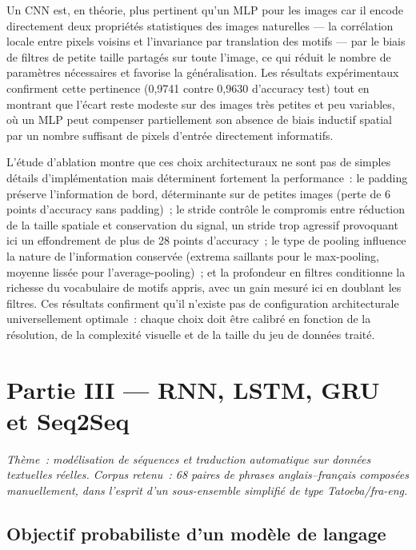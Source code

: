 \documentclass[11pt,a4paper]{article}
\begin{document}
\medskip
Un CNN est, en théorie, plus pertinent qu'un MLP pour les images car il encode directement deux propriétés statistiques des images naturelles --- la corrélation locale entre pixels voisins et l'invariance par translation des motifs --- par le biais de filtres de petite taille partagés sur toute l'image, ce qui réduit le nombre de paramètres nécessaires et favorise la généralisation. Les résultats expérimentaux confirment cette pertinence (0,9741 contre 0,9630 d'accuracy test) tout en montrant que l'écart reste modeste sur des images très petites et peu variables, où un MLP peut compenser partiellement son absence de biais inductif spatial par un nombre suffisant de pixels d'entrée directement informatifs.

L'étude d'ablation montre que ces choix architecturaux ne sont pas de simples détails d'implémentation mais déterminent fortement la performance~: le padding préserve l'information de bord, déterminante sur de petites images (perte de 6 points d'accuracy sans padding)~; le stride contrôle le compromis entre réduction de la taille spatiale et conservation du signal, un stride trop agressif provoquant ici un effondrement de plus de 28 points d'accuracy~; le type de pooling influence la nature de l'information conservée (extrema saillants pour le max-pooling, moyenne lissée pour l'average-pooling)~; et la profondeur en filtres conditionne la richesse du vocabulaire de motifs appris, avec un gain mesuré ici en doublant les filtres. Ces résultats confirment qu'il n'existe pas de configuration architecturale universellement optimale~: chaque choix doit être calibré en fonction de la résolution, de la complexité visuelle et de la taille du jeu de données traité.

\newpage
\section{Partie III --- RNN, LSTM, GRU et Seq2Seq}

\textit{Thème~: modélisation de séquences et traduction automatique sur données textuelles réelles. Corpus retenu~: 68 paires de phrases anglais--français composées manuellement, dans l'esprit d'un sous-ensemble simplifié de type Tatoeba/fra-eng.}

\subsection{Objectif probabiliste d'un modèle de langage}
\end{document}
